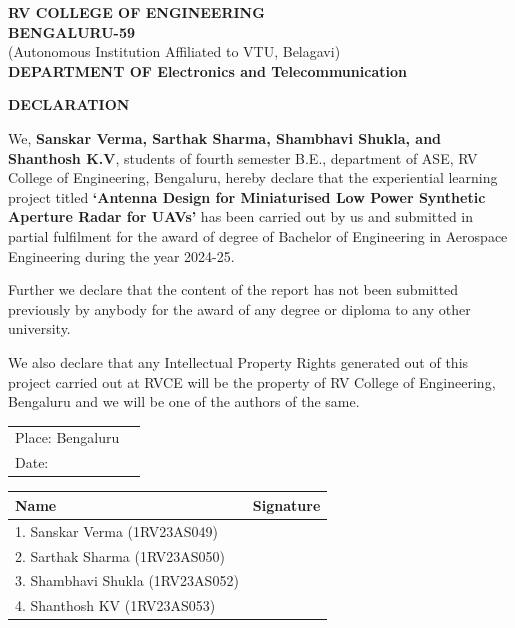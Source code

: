 \documentclass[12pt]{article}
\begin{document}
\newpage
\thispagestyle{empty}

\begin{center}
{\large \textbf{RV COLLEGE OF ENGINEERING}}\\
\vspace{0.25cm}
\textbf{BENGALURU-59}\\
\vspace{0.25cm}
{\small (Autonomous Institution Affiliated to VTU, Belagavi)}\\
\vspace{0.25cm}
{\large \textbf{DEPARTMENT OF Electronics and Telecommunication}}

\vspace{1cm}
{\Large \textbf{DECLARATION}}
\end{center}

\vspace{1.5cm}

We, \textbf{Sanskar Verma, Sarthak Sharma, Shambhavi Shukla, and Shanthosh K.V}, students of fourth semester B.E., department of ASE, RV College of Engineering, Bengaluru, hereby declare that the experiential learning project titled \textbf{`Antenna Design for Miniaturised Low Power Synthetic Aperture Radar for UAVs'} has been carried out by us and submitted in partial fulfilment for the award of degree of Bachelor of Engineering in Aerospace Engineering during the year 2024-25.

Further we declare that the content of the report has not been submitted previously by anybody for the award of any degree or diploma to any other university.

We also declare that any Intellectual Property Rights generated out of this project carried out at RVCE will be the property of RV College of Engineering, Bengaluru and we will be one of the authors of the same.

\vspace{1cm}

\begin{tabular}{ll}
Place: Bengaluru & \\
Date: & \\
\end{tabular}

\vspace{2cm}

\begin{tabular}{|p{}|p{}|}
\hline
\textbf{Name} & \textbf{Signature} \\
\hline
1. Sanskar Verma (1RV23AS049) & \\
\hline
2. Sarthak Sharma (1RV23AS050) & \\
\hline
3. Shambhavi Shukla (1RV23AS052) & \\
\hline
4. Shanthosh KV (1RV23AS053) & \\
\hline
\end{tabular}
\end{document}
